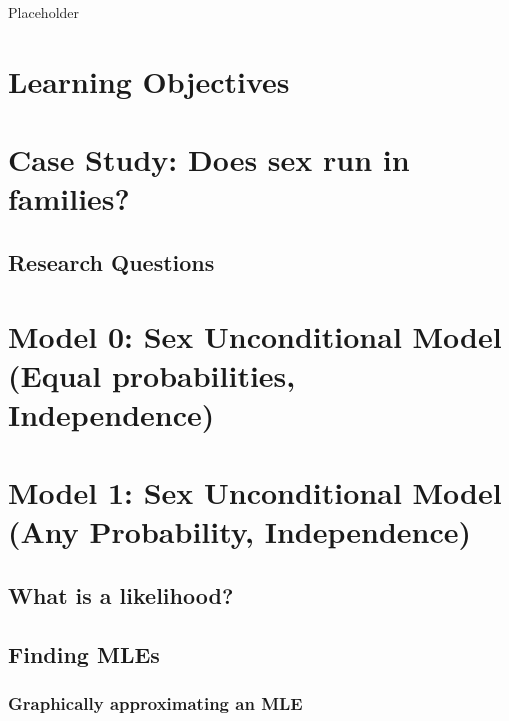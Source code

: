 \documentclass[
]{krantz}
\begin{document}
Placeholder

\hypertarget{learning-objectives-1}{%
\section{Learning Objectives}\label{learning-objectives-1}}

\hypertarget{case-study-does-sex-run-in-families}{%
\section{Case Study: Does sex run in families?}\label{case-study-does-sex-run-in-families}}

\hypertarget{research-questions}{%
\subsection{Research Questions}\label{research-questions}}

\hypertarget{model-0-sex-unconditional-model-equal-probabilities-independence}{%
\section{Model 0: Sex Unconditional Model (Equal probabilities, Independence)}\label{model-0-sex-unconditional-model-equal-probabilities-independence}}

\hypertarget{sex_unconditional_model}{%
\section{Model 1: Sex Unconditional Model (Any Probability, Independence)}\label{sex_unconditional_model}}

\hypertarget{what-is-a-likelihood}{%
\subsection{What is a likelihood?}\label{what-is-a-likelihood}}

\hypertarget{findMLE.sec}{%
\subsection{Finding MLEs}\label{findMLE.sec}}

\hypertarget{MLEgph.sec}{%
\subsubsection{Graphically approximating an MLE}\label{MLEgph.sec}}
\end{document}
